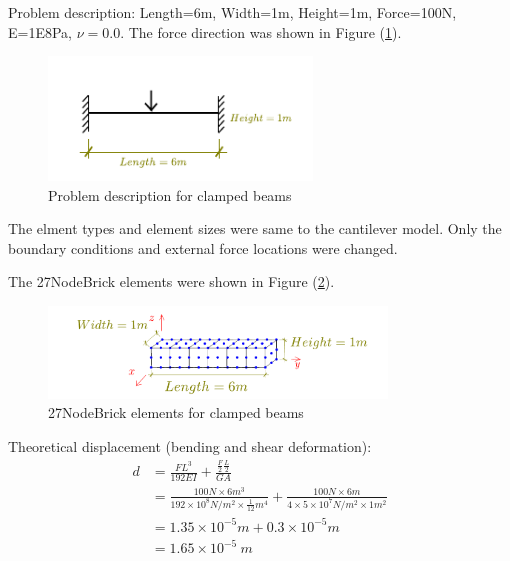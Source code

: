 \documentclass[fleqn,11pt,letter]{article}
\begin{document}
Problem description: Length=6m, Width=1m, Height=1m, Force=100N, E=1E8Pa, $\nu=0.0$.  The force direction was shown in Figure (\ref{fig Problem description for clamped beams 27}). 

\begin{figure}[H]
  \centering
  \includegraphics[width=7cm]{../Figure_files/27NodeBrick/clamped_beam.pdf}
  \caption{Problem description for clamped beams}
  \label{fig Problem description for clamped beams 27}
\end{figure}




The elment types and element sizes were same to the cantilever model. Only the boundary conditions and external force locations were changed. 

The 27NodeBrick elements were shown in Figure (\ref{fig 27NodeBrick elements for clamped beams}). 
\begin{figure}[H]
  \centering
  \includegraphics[width=9cm]{../Figure_files/27NodeBrick/beam_27brick.pdf}
  \caption{27NodeBrick elements for clamped beams}
  \label{fig 27NodeBrick elements for clamped beams}
\end{figure}

Theoretical displacement (bending and shear deformation):
\begin{equation}
  \begin{aligned}
  d &=\frac{FL^3}{192EI}+\frac{\frac{F}{2}\frac{L}{2}}{GA}  \\
   &= \frac{100 N\times 6 m^3}{192 \times 10^8 N/m^2 \times \frac{1}{12} m^4}+ 
    \frac{100 N \times 6 m}{4\times 5\times 10^7 N/m^2\times 1 m^2}   \\
  &=1.35\times 10^{-5} m + 0.3\times 10^{-5} m  \\
  &=1.65\times 10^{-5} \ m 
    \end{aligned}
\end{equation}
\end{document}
